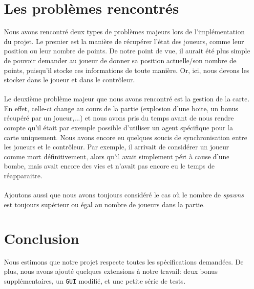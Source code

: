 \documentclass{article}
\begin{document}
\section{Les problèmes rencontrés}
Nous avons rencontré deux types de problèmes majeurs lors de l'implémentation du projet. Le premier est la manière de récupérer l'état des joueurs, comme leur position ou leur nombre de points. De notre point de vue, il aurait été plus simple de pouvoir demander au joueur de donner sa position actuelle/son nombre de points, puisqu'il stocke ces informations de toute manière. Or, ici, nous devons les stocker dans le joueur et dans le contrôleur.\\ \\
Le deuxième problème majeur que nous avons rencontré est la gestion de la carte. En effet, celle-ci change au cours de la partie (explosion d'une boite, un bonus récupéré par un joueur,...) et nous avons pris du temps avant de nous rendre compte qu'il était par exemple possible d'utiliser un agent spécifique pour la carte uniquement. Nous avons encore eu quelques soucis de synchronisation entre les joueurs et le contrôleur. Par exemple, il arrivait de considérer un joueur comme mort définitivement, alors qu'il avait simplement péri à cause d'une bombe, mais avait encore des vies et n'avait pas encore eu le temps de réapparaitre.\\ \\
Ajoutons aussi que nous avons toujours considéré le cas où le nombre de \emph{spawns} est toujours supérieur ou égal au nombre de joueurs dans la partie.

\section{Conclusion}
Nous estimons que notre projet respecte toutes les spécifications demandées. De plus, nous avons ajouté quelques extensions à notre travail: deux bonus supplémentaires, un \texttt{GUI} modifié, et une petite série de tests. 
\end{document}
